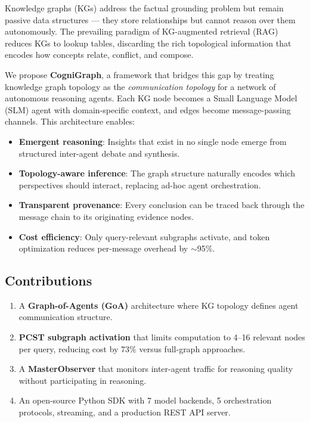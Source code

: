\documentclass[11pt,a4paper]{article}
\begin{document}
Knowledge graphs (KGs) address the factual grounding problem but remain passive data structures --- they store relationships but cannot reason over them autonomously. The prevailing paradigm of KG-augmented retrieval (RAG) reduces KGs to lookup tables, discarding the rich topological information that encodes how concepts relate, conflict, and compose.

We propose \textbf{CogniGraph}, a framework that bridges this gap by treating knowledge graph topology as the \emph{communication topology} for a network of autonomous reasoning agents. Each KG node becomes a Small Language Model (SLM) agent with domain-specific context, and edges become message-passing channels. This architecture enables:

\begin{itemize}
    \item \textbf{Emergent reasoning}: Insights that exist in no single node emerge from structured inter-agent debate and synthesis.
    \item \textbf{Topology-aware inference}: The graph structure naturally encodes which perspectives should interact, replacing ad-hoc agent orchestration.
    \item \textbf{Transparent provenance}: Every conclusion can be traced back through the message chain to its originating evidence nodes.
    \item \textbf{Cost efficiency}: Only query-relevant subgraphs activate, and token optimization reduces per-message overhead by $\sim$95\%.
\end{itemize}

\subsection{Contributions}
\begin{enumerate}
    \item A \textbf{Graph-of-Agents (GoA)} architecture where KG topology defines agent communication structure.
    \item \textbf{PCST subgraph activation} that limits computation to 4--16 relevant nodes per query, reducing cost by 73\% versus full-graph approaches.
    \item A \textbf{MasterObserver} that monitors inter-agent traffic for reasoning quality without participating in reasoning.
    \item An open-source Python SDK with 7 model backends, 5 orchestration protocols, streaming, and a production REST API server.
\end{enumerate}
\end{document}

